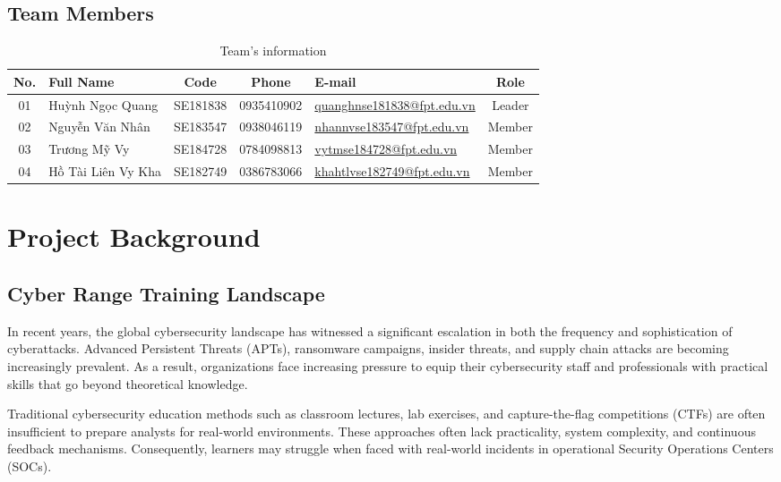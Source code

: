 \subsection{Team Members}
\begin{table}[H]
	\centering
	\begin{tabularx}{\textwidth}{|c|l|c|c|>{\raggedright\arraybackslash}X|c|}
		\hline
		\textbf{No.} & \textbf{Full Name} & \textbf{Code} & \textbf{Phone} & \textbf{E-mail} & \textbf{Role} \\
		\hline
		01 & Huỳnh Ngọc Quang & SE181838 & 0935410902 & \url{quanghnse181838@fpt.edu.vn} & Leader \\
		\hline
		02 & Nguyễn Văn Nhân & SE183547 & 0938046119 & \url{nhannvse183547@fpt.edu.vn} & Member \\
		\hline
		03 & Trương Mỹ Vy & SE184728 & 0784098813 & \url{vytmse184728@fpt.edu.vn} & Member \\
		\hline
		04 & Hồ Tài Liên Vy Kha & SE182749 & 0386783066 & \url{khahtlvse182749@fpt.edu.vn} & Member \\
		\hline
	\end{tabularx}
	\caption{Team's information}
\end{table}

\section{Project Background}

\subsection{Cyber Range Training Landscape}
In recent years, the global cybersecurity landscape has witnessed a significant escalation in both the frequency and sophistication of cyberattacks. Advanced Persistent Threats (APTs), ransomware campaigns, insider threats, and supply chain attacks are becoming increasingly prevalent. As a result, organizations face increasing pressure to equip their cybersecurity staff and professionals with practical skills that go beyond theoretical knowledge.

Traditional cybersecurity education methods such as classroom lectures, lab exercises, and capture-the-flag competitions (CTFs) are often insufficient to prepare analysts for real-world environments. These approaches often lack practicality, system complexity, and continuous feedback mechanisms. Consequently, learners may struggle when faced with real-world incidents in operational Security Operations Centers (SOCs).

